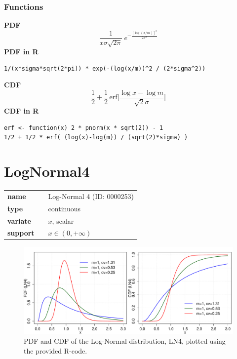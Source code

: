 \subsubsection*{Functions}

\smallskip \noindent \hspace{.2cm} \textbf{PDF} 
\begin{equation*}\frac{1}{x\sigma\sqrt{2\pi}}\ e^{-\frac{\left[\log (x/m)\right]^2}{2\sigma^2}}\end{equation*}
\smallskip \noindent \hspace{.2cm} \textbf{PDF in R}  
\begin{verbatim}1/(x*sigma*sqrt(2*pi)) * exp(-(log(x/m))^2 / (2*sigma^2))\end{verbatim}
\smallskip \noindent \hspace{.2cm} \textbf{CDF} 
\begin{equation*}\frac12 + \frac12\,\text{erf}\Big[\frac{\log x-\log m}{\sqrt{2}\sigma}\Big]\end{equation*}
\smallskip \noindent \hspace{.2cm} \textbf{CDF in R}  
\begin{verbatim}
erf <- function(x) 2 * pnorm(x * sqrt(2)) - 1
1/2 + 1/2 * erf( (log(x)-log(m)) / (sqrt(2)*sigma) )\end{verbatim}
\smallskip\section*{LogNormal4} 

  \bigskip 

\begin{tabular}{p{2cm}cl}
\textbf{name} & & Log-Normal 4 (ID: 0000253)\\ 
 
\textbf{type} & & continuous \\ 

\textbf{variate} & & $x$, scalar \\ 

\textbf{support} & & $x \in (0,+\infty)$
\end{tabular}

\begin{figure}[htb!]
\centering
  \includegraphics[width=140mm]{pics/LogNormal4_pdf_cdf.pdf}
 \caption{PDF and CDF of the Log-Normal distribution, LN4,
 plotted using the provided R-code.}
 \label{fig:LN4pdfcdf}
\end{figure}

